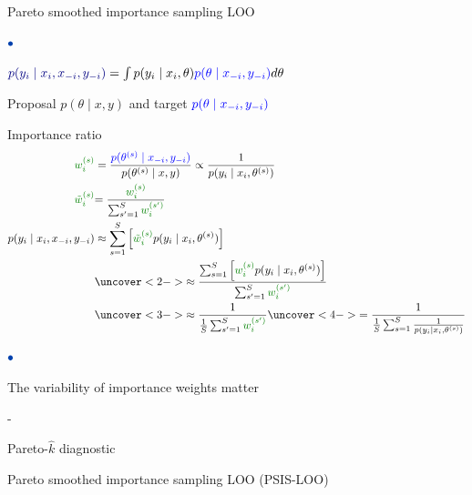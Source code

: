 \documentclass[english,t]{beamer}
\newenvironment{list1}{
   \begin{list}{$\color{list1}\bullet$}{\itemsep=6pt}}{
  \end{list}}
\newenvironment{list2}{
  \begin{list}{-}{\baselineskip=12pt\itemsep=2pt}}{
  \end{list}}
\begin{document}
\begin{frame}{Pareto smoothed importance sampling LOO}

  \begin{list1}
  \item ${\color{navyblue}p(y_i \mid x_i,x_{-i}, y_{-i})} = \int p(y_i \mid x_i,\theta){\color{blue} p(\theta \mid x_{-i}, y_{-i})} d\theta$
  \item Proposal $p(\theta \mid x,y)$ and target ${\color{blue} p(\theta \mid x_{-i}, y_{-i})}$
  \item Importance ratio
    \begin{align*}
    {\color{darkgreen} w_i^{(s)}} & = \frac{{\color{blue} p(\theta^{(s)} \mid x_{-i}, y_{-i})}}{p(\theta^{(s)} \mid x,y)}\propto \frac{1}{p(y_i \mid x_i,\theta^{(s)})}\\
      {\color{darkgreen}\tilde{w}_i^{(s)}}&{=\frac{{\color{darkgreen} w_i^{(s)}}}{\sum_{s'=1}^S {\color{darkgreen} w_i^{(s')}}}}\\
      p(y_i \mid x_i,x_{-i},y_{-i}) & \approx \sum_{s=1}^S \left[{\color{darkgreen}  \tilde{w}_i^{(s)}} p(y_i \mid x_i,\theta^{(s)})\right] \\
                                  & \uncover<2->{\approx  \frac {\sum_{s=1}^S \left[{\color{darkgreen}  {w}_i^{(s)}} p(y_i \mid x_i,\theta^{(s)})\right]}{\sum_{s'=1}^S {\color{darkgreen} w_i^{(s')}}}} \\
                                  & \uncover<3->{\approx \frac{1}{\frac{1}{S}\sum_{s'=1}^S {\color{darkgreen} w_i^{(s')}}} } \uncover<4->{ = \frac{1}{\frac{1}{S}\sum_{s=1}^S {\frac{1}{p(y_i \mid x_i,\theta^{(s)})}}} }
    \end{align*}
  \end{list1}

  \begin{list1}
  \item The variability of importance weights matter
    \begin{list2}
    \item Pareto-$\hat{k}$ diagnostic
    \item Pareto smoothed importance sampling LOO (PSIS-LOO)
    \end{list2}
  \end{list1}
\end{frame}
\end{document}

